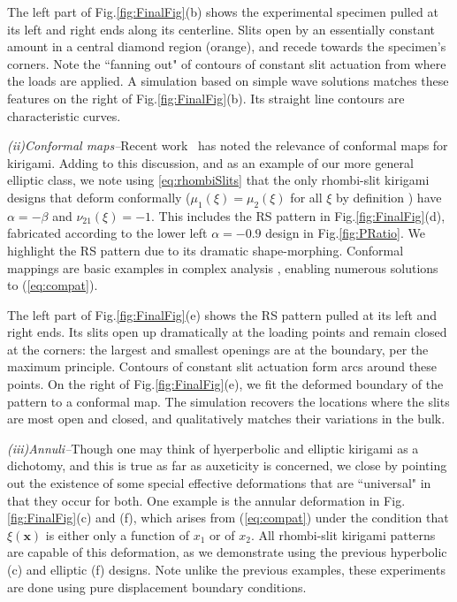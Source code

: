 \documentclass[aps,prl,twocolumn,superscriptaddress]{revtex4-1}
\begin{document}
The left part of Fig.\;\ref{fig:FinalFig}(b) shows the experimental specimen pulled at its left and right ends along its centerline.  Slits open by an essentially constant amount in a central diamond region (orange), and recede towards the specimen's corners. Note the  ``fanning out" of contours of constant slit actuation from where the loads are applied. A simulation based on simple wave solutions matches these features on the right of Fig.\;\ref{fig:FinalFig}(b). Its straight line contours are characteristic curves. 


\noindent\textit{(ii)\;Conformal maps\;--\;}Recent work~\cite{czajkowski2022conformal} has noted the relevance of conformal maps for kirigami. Adding to this discussion, and as an example of our more general elliptic class, we note using  \eqref{eq:rhombiSlits} that the only rhombi-slit kirigami designs that deform conformally ($\mu_1(\xi)=\mu_2(\xi)$ for all $\xi$ by definition \cite{do2016differential}) have $\alpha=-\beta$ and $\nu_{21}(\xi) = -1$.  This includes the RS pattern in Fig.\;\ref{fig:FinalFig}(d), fabricated according to the lower left $\alpha = -0.9$ design in Fig.\;\ref{fig:PRatio}. We highlight the RS pattern due to its dramatic shape-morphing. Conformal mappings are basic examples in complex analysis \cite{brown2009complex}, enabling  numerous solutions to (\ref{eq:compat}).

The left part of Fig.\;\ref{fig:FinalFig}(e) shows the RS pattern pulled at its left and right ends. Its slits open up dramatically at the loading points and remain closed at the corners: the largest and smallest openings are at the boundary, per the maximum principle. Contours of constant slit actuation form arcs around these points. On the right of Fig.\;\ref{fig:FinalFig}(e), we fit the deformed boundary of the pattern to a conformal map. The simulation recovers the locations where the slits are most open and closed, and qualitatively matches their variations in the bulk. 


\noindent\textit{(iii)\;Annuli\;--\;}Though one may think of hyerperbolic and elliptic kirigami as a dichotomy, and this is true as far as auxeticity is concerned, we close by pointing out the existence of some special effective deformations that are ``universal" in that they occur for both.  One example is the annular deformation in Fig.\;\ref{fig:FinalFig}(c) and (f), which arises from  (\ref{eq:compat}) under the condition that $\xi(\mathbf{x})$ is either only a function of $x_1$ or of $x_2$.  All rhombi-slit kirigami patterns are capable of this deformation, as we demonstrate using the previous hyperbolic (c) and elliptic (f) designs. Note unlike the previous examples, these experiments are done using pure displacement boundary conditions.
\end{document}

